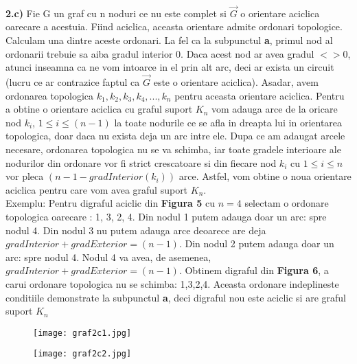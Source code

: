 \documentclass{article}
\begin{document}
\\
\par\textbf{2.c)} Fie G un graf cu n noduri ce nu este complet si $\vec{G}$ o orientare aciclica oarecare a acestuia. Fiind aciclica, aceasta orientare admite ordonari topologice. Calculam una dintre aceste ordonari. La fel ca la subpunctul \textbf{a}, primul nod al ordonarii trebuie sa aiba gradul interior 0. Daca acest nod ar avea gradul $<> 0$, atunci inseamna ca ne vom intoarce in el prin alt arc, deci ar exista un circuit (lucru ce ar contrazice faptul ca  $\vec{G}$ este o orientare aciclica). Asadar, avem ordonarea topologica $k_{1},k_{2},k_{3},k_{4},...,k_{n}$ pentru aceasta orientare aciclica. Pentru a obtine o orientare aciclica cu graful suport $K_{n}$ vom adauga arce de la oricare nod $k_{i}$, $1\leq i \leq (n-1)$ la toate nodurile ce se afla in dreapta lui in orientarea topologica, doar daca nu exista deja un arc intre ele. Dupa ce am adaugat arcele necesare, ordonarea topologica nu se va schimba, iar toate gradele interioare ale nodurilor din ordonare vor fi strict crescatoare si din fiecare nod $k_{i}$ cu $1\leq i \leq n$ vor pleca $(n-1-gradInterior(k_{i}))$ arce. Astfel, vom obtine o noua orientare aciclica pentru care vom avea graful suport $K_{n}$.
\\ Exemplu: Pentru digraful aciclic din \textbf{Figura 5} cu $n=4$ selectam o ordonare topologica oarecare : 1, 3, 2, 4. Din nodul 1 putem adauga doar un arc: spre nodul 4. Din nodul 3 nu putem adauga arce deoarece are deja $gradInterior+gradExterior=(n-1)$. Din nodul 2 putem adauga doar un arc: spre nodul 4. Nodul 4 va avea, de asemenea, $gradInterior+gradExterior=(n-1)$. Obtinem digraful din \textbf{Figura 6}, a carui ordonare topologica nu se schimba: 1,3,2,4. Aceasta ordonare indeplineste conditiile demonstrate la subpunctul \textbf{a}, deci digraful nou este aciclic si are graful suport $K_{n}$
\begin{frame}{}
 \begin{figure}[ht]
 \centering
   \begin{minipage}[b]{0.23\linewidth}
           
         
            \caption{}
           
           \texttt{[image: graf2c1.jpg]}
           
        \end{minipage}
        \hspace{0.6cm}
  \begin{minipage}[b]{0.20\linewidth}
           
         
            \caption{}
           
           \texttt{[image: graf2c2.jpg]}
           
        \end{minipage}
\end{figure}
\end{frame}
\end{document}
